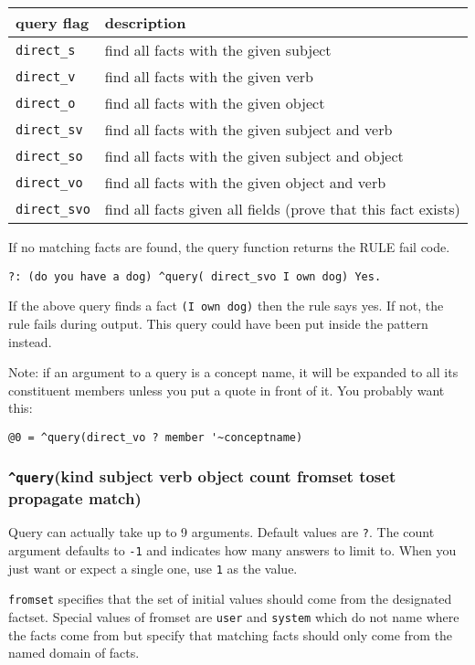 \documentclass[]{article}
\begin{document}
\begin{longtable}[]{@{}ll@{}}
\toprule
query flag & description\tabularnewline
\midrule
\endhead
\texttt{direct\_s} & find all facts with the given
subject\tabularnewline
\texttt{direct\_v} & find all facts with the given verb\tabularnewline
\texttt{direct\_o} & find all facts with the given object\tabularnewline
\texttt{direct\_sv} & find all facts with the given subject and
verb\tabularnewline
\texttt{direct\_so} & find all facts with the given subject and
object\tabularnewline
\texttt{direct\_vo} & find all facts with the given object and
verb\tabularnewline
\texttt{direct\_svo} & find all facts given all fields (prove that this
fact exists)\tabularnewline
\bottomrule
\end{longtable}

If no matching facts are found, the query function returns the RULE fail
code.

\begin{verbatim}
?: (do you have a dog) ^query( direct_svo I own dog) Yes.
\end{verbatim}

If the above query finds a fact \texttt{(I\ own\ dog)} then the rule
says yes. If not, the rule fails during output. This query could have
been put inside the pattern instead.

Note: if an argument to a query is a concept name, it will be expanded
to all its constituent members unless you put a quote in front of it.
You probably want this:

\begin{verbatim}
@0 = ^query(direct_vo ? member '~conceptname)
\end{verbatim}

\subsubsection{\texorpdfstring{\texttt{\^{}query}(kind subject verb
object count fromset toset propagate
match)}{\^{}query(kind subject verb object count fromset toset propagate match)}}\label{querykind-subject-verb-object-count-fromset-toset-propagate-match}

Query can actually take up to 9 arguments. Default values are
\texttt{?}. The count argument defaults to \texttt{-1} and indicates how
many answers to limit to. When you just want or expect a single one, use
\texttt{1} as the value.

\texttt{fromset} specifies that the set of initial values should come
from the designated factset. Special values of fromset are \texttt{user}
and \texttt{system} which do not name where the facts come from but
specify that matching facts should only come from the named domain of
facts.
\end{document}
